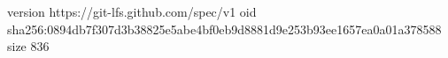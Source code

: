 version https://git-lfs.github.com/spec/v1
oid sha256:0894db7f307d3b38825e5abe4bf0eb9d8881d9e253b93ee1657ea0a01a378588
size 836
